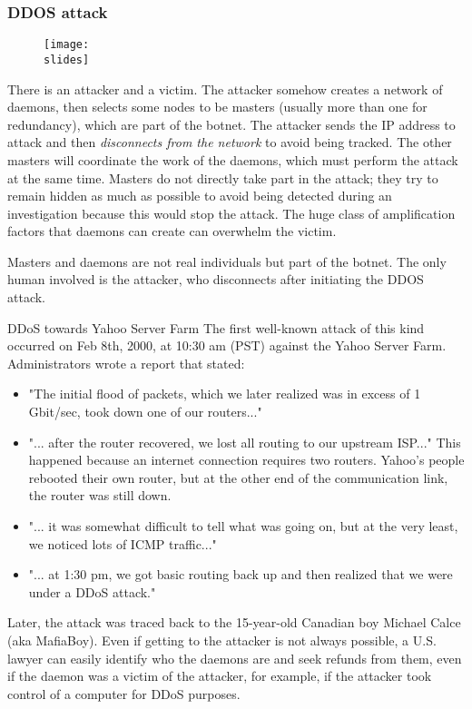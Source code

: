 \subsubsection{DDOS attack}

\begin{figure}[h]
  \centering
  \texttt{[image: \\slides]}
\end{figure}

There is an attacker and a victim. The attacker somehow creates a network of daemons, then selects some nodes to be masters (usually more than one for redundancy), which are part of the botnet. The attacker sends the IP address to attack and then \emph{disconnects from the network} to avoid being tracked. The other masters will coordinate the work of the daemons, which must perform the attack at the same time. Masters do not directly take part in the attack; they try to remain hidden as much as possible to avoid being detected during an investigation because this would stop the attack. The huge class of amplification factors that daemons can create can overwhelm the victim.

Masters and daemons are not real individuals but part of the botnet. The only human involved is the attacker, who disconnects after initiating the DDOS attack.

\begin{casehistory}{DDoS towards Yahoo Server Farm}
  The first well-known attack of this kind occurred on Feb 8th, 2000, at 10:30 am (PST) against the Yahoo Server Farm. Administrators wrote a report that stated:
  \begin{itemize}
    \item "The initial flood of packets, which we later realized was in excess of 1 Gbit/sec, took down one of our routers..."
    \item "... after the router recovered, we lost all routing to our upstream ISP..." This happened because an internet connection requires two routers. Yahoo's people rebooted their own router, but at the other end of the communication link, the router was still down.
    \item "... it was somewhat difficult to tell what was going on, but at the very least, we noticed lots of ICMP traffic..."
    \item "... at 1:30 pm, we got basic routing back up and then realized that we were under a DDoS attack."
  \end{itemize}
  Later, the attack was traced back to the 15-year-old Canadian boy Michael Calce (aka MafiaBoy). Even if getting to the attacker is not always possible, a U.S. lawyer can easily identify who the daemons are and seek refunds from them, even if the daemon was a victim of the attacker, for example, if the attacker took control of a computer for DDoS purposes.
\end{casehistory}


